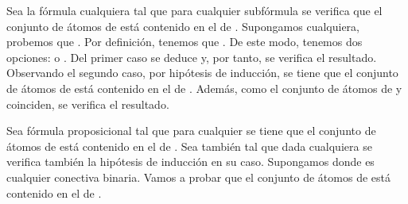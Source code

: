 \begin{isabellebody}
\begin{isamarkuptext}
\begin{demostracion}
  Sea la fórmula  cualquiera tal que para cualquier subfórmula 
   se verifica que el conjunto de átomos de  está 
  contenido en el de . Supongamos  cualquiera, 
  probemos que .
  Por definición, tenemos que . De este 
  modo, tenemos dos opciones:
   o . Del primer caso se deduce  
  y, por tanto, se verifica el resultado. Observando el segundo caso, 
  por hipótesis de inducción, se tiene que el conjunto de átomos de 
  está contenido en el de . Además, como el conjunto de átomos de 
   y  coinciden, se verifica el resultado.

  Sea  fórmula proposicional tal que para cualquier  
  se tiene que el conjunto de átomos de  está contenido en el de 
  . Sea también  tal que dada  cualquiera se 
  verifica también la hipótesis de inducción en su caso. Supongamos 
   donde \isa{{\isacharasterisk}} es cualquier conectiva binaria. Vamos a 
  probar que el conjunto de átomos de  está contenido en el de 
  .


\end{demostracion}
\end{isamarkuptext}
\end{isabellebody}
